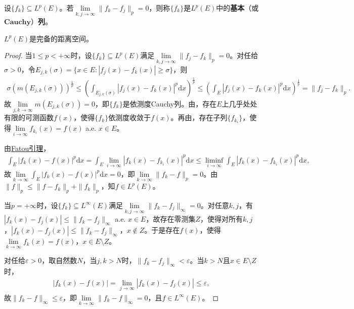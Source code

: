 \documentclass[../../main.tex]{subfiles}%
\begin{document}
\begin{definition}
设$\{f_k\}\subseteq L^p(E)$。若$\lim\limits_{k,j\to\infty}\|f_k-f_j\|_p=0$，则称$\{f_k\}$是$L^p(E)$中的\textbf{基本}（或$\mathbf{Cauchy}$）\textbf{列}。
\end{definition}

\begin{theorem}\label{theorem:Riesz-Fischer定理的另一种常用形式}
$L^p(E)$是完备的距离空间。
\end{theorem}
\begin{proof}
当$1\leqslant p<+\infty$时，设$\{f_k\}\subseteq L^p(E)$满足$\lim\limits_{k,j\to\infty}\|f_j-f_k\|_p=0$。对任给$\sigma>0$，令$E_{j,k}(\sigma)=\{x\in E:|f_j(x)-f_k(x)|\geqslant\sigma\}$，则
\begin{align*}
\sigma(m(E_{j,k}(\sigma)))^{\frac{1}{p}}\leqslant\left(\int_{E_{j,k}(\sigma)}|f_j(x)-f_k(x)|^p\mathrm{d}x\right)^{\frac{1}{p}}
\leqslant\left(\int_E|f_j(x)-f_k(x)|^p\mathrm{d}x\right)^{\frac{1}{p}}=\|f_j-f_k\|_p.
\end{align*}
故$\lim\limits_{j,k\to\infty}m(E_{j,k}(\sigma))=0$，即$\{f_k\}$是依测度Cauchy列。由，存在$E$上几乎处处有限的可测函数$f(x)$，使得$\{f_k\}$依测度收敛于$f(x)$。再由，存在子列$\{f_{k_i}\}$，使得$\lim\limits_{i\to\infty}f_{k_i}(x)=f(x)$ a.e. $x\in E$。

由\hyperref[theorem:Fatou引理]{Fatou引理}，
\begin{align*}
\int_E|f_k(x)-f(x)|^p\mathrm{d}x=\int_E\lim\limits_{i\to\infty}|f_k(x)-f_{k_i}(x)|^p\mathrm{d}x
\leqslant\liminf\limits_{i\to\infty}\int_E|f_k(x)-f_{k_i}(x)|^p\mathrm{d}x,
\end{align*}
故$\lim\limits_{k\to\infty}\int_E|f_k(x)-f(x)|^p\mathrm{d}x=0$，即$\lim\limits_{k\to\infty}\|f_k-f\|_p=0$。由$\|f\|_p\leqslant\|f-f_k\|_p+\|f_k\|_p$，知$f\in L^p(E)$。

当$p=+\infty$时，设$\{f_k\}\subseteq L^\infty(E)$满足$\lim\limits_{k,j\to\infty}\|f_k-f_j\|_\infty=0$。对任意$k,j$，有$|f_k(x)-f_j(x)|\leqslant\|f_k-f_j\|_\infty$ a.e. $x\in E$，故存在零测集$Z$，使得对所有$k,j$，$|f_k(x)-f_j(x)|\leqslant\|f_k-f_j\|_\infty$，$x\notin Z$。于是存在$f(x)$，使得$\lim\limits_{k\to\infty}f_k(x)=f(x)$，$x\in E\setminus Z$。

对任给$\varepsilon>0$，取自然数$N$，当$j,k>N$时，$\|f_k-f_j\|_\infty<\varepsilon$。当$k>N$且$x\in E\setminus Z$时，
\begin{align*}
|f_k(x)-f(x)|=\lim\limits_{j\to\infty}|f_k(x)-f_j(x)|\leqslant\varepsilon,
\end{align*}
故$\|f_k-f\|_\infty\leqslant\varepsilon$，即$\lim\limits_{k\to\infty}\|f_k-f\|_\infty=0$，且$f\in L^\infty(E)$。
\end{proof}
\end{document}
